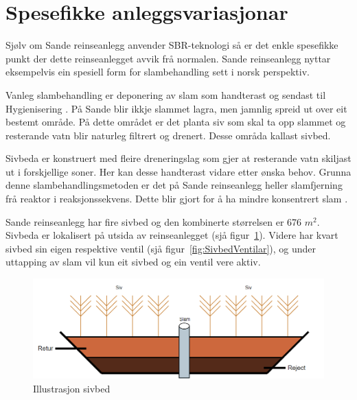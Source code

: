 \newpage
\section{Spesefikke anleggsvariasjonar}
\thispagestyle{fancy}

Sjølv om Sande reinseanlegg anvender \gls{SBR}-teknologi så er det enkle spesefikke
punkt der dette reinseanlegget avvik frå normalen. 
Sande reinseanlegg nyttar eksempelvis ein spesiell form for slambehandling sett i norsk perspektiv.

Vanleg slambehandling er deponering av slam som handterast og sendast til \gls{Hygienisering} \citep{Slam}. \newline
På Sande blir ikkje slammet lagra, men jamnlig spreid ut over eit bestemt område. På dette området er
det planta siv som skal ta opp slammet og resterande vatn blir naturleg filtrert og drenert.
Desse områda kallast sivbed.

Sivbeda er konstruert med fleire dreneringslag som gjer at resterande vatn skiljast ut i forskjellige soner.
Her kan desse handterast vidare etter ønska behov. 
Grunna denne slambehandlingsmetoden er det på Sande reinseanlegg heller slamfjerning frå reaktor
i reaksjonssekvens. Dette blir gjort for å ha mindre konsentrert slam \citep{MDPI}.

Sande reinseanlegg har fire sivbed og den kombinerte størrelsen er 676 $m^2$. Sivbeda er lokalisert på utsida av reinseanlegget (sjå figur~\ref{fig:Sivbed}).\newline
Videre har kvart sivbed sin eigen respektive ventil (sjå figur~\ref{fig:SivbedVentilar}), og under uttapping av slam vil kun eit sivbed og ein ventil vere aktiv. 
 

\begin{figure}[htbp]
    \centering
    \includegraphics[width=1\textwidth]{Figurar/Sivbed.png}
    \caption{Illustrasjon sivbed}\label{fig:Sivbed}
\end{figure}

\newpage

